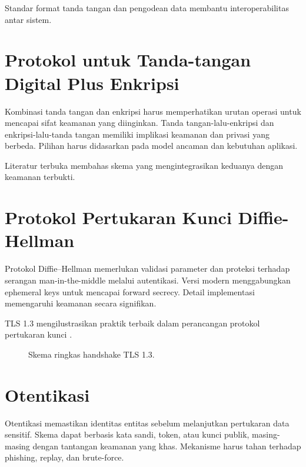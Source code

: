 \documentclass[../main.tex]{subfiles}
\begin{document}
Standar format tanda tangan dan pengodean data membantu interoperabilitas antar sistem.

\section{Protokol untuk Tanda-tangan Digital Plus Enkripsi}
Kombinasi tanda tangan dan enkripsi harus memperhatikan urutan operasi untuk mencapai sifat keamanan yang diinginkan. Tanda tangan-lalu-enkripsi dan enkripsi-lalu-tanda tangan memiliki implikasi keamanan dan privasi yang berbeda. Pilihan harus didasarkan pada model ancaman dan kebutuhan aplikasi.

Literatur terbuka membahas skema yang mengintegrasikan keduanya dengan keamanan terbukti.

\section{Protokol Pertukaran Kunci Diffie-Hellman}
Protokol Diffie--Hellman memerlukan validasi parameter dan proteksi terhadap serangan man-in-the-middle melalui autentikasi. Versi modern menggabungkan ephemeral keys untuk mencapai forward secrecy. Detail implementasi memengaruhi keamanan secara signifikan.

TLS 1.3 mengilustrasikan praktik terbaik dalam perancangan protokol pertukaran kunci \parencite{rfc8446}.

\begin{figure}[h]
\centering
{}
\caption{Skema ringkas handshake TLS 1.3.}
\label{fig:tls13}
\end{figure}

\section{Otentikasi}
Otentikasi memastikan identitas entitas sebelum melanjutkan pertukaran data sensitif. Skema dapat berbasis kata sandi, token, atau kunci publik, masing-masing dengan tantangan keamanan yang khas. Mekanisme harus tahan terhadap phishing, replay, dan brute-force.
\end{document}
